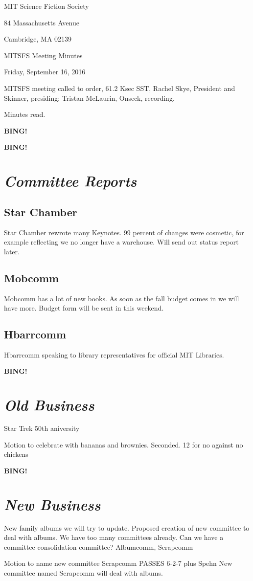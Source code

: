\documentclass[10pt]{article}
\newcommand{\bing}{{\bf BING!} }
\newcommand{\goto}[1]{\bing \vskip 12pt \section*{{\em{#1}}}}
\newcommand{\ps}{ plus Spehn\xspace}
\newcommand{\skinner}{Rachel Skye, President and Skinner}
\newcommand{\onseck}{Tristan McLaurin, Onseck}
\newcommand{\meetingdate}{Friday, September 16, 2016}
\begin{document}
\begin{center}

MIT Science Fiction Society

84 Massachusetts Avenue

Cambridge, MA 02139

\vspace{12pt}

MITSFS Meeting Minutes

\meetingdate

\end{center}

\vspace{18pt}

\setlength{\parskip}{6pt}

\noindent
MITSFS meeting called to order, 61.2 Ksec SST,
\skinner, presiding; \onseck, recording.

Minutes read.

\bing

\goto{Committee Reports}
\subsection*{Star Chamber}
Star Chamber rewrote many Keynotes. 99 percent of changes were cosmetic, for example reflecting we no longer have a warehouse. Will send out status report later.

\subsection*{Mobcomm}
Mobcomm has a lot of new books. As soon as the fall budget comes in we will have more. Budget form will be sent in this weekend.

\subsection*{Hbarrcomm}
Hbarrcomm speaking to library representatives for official MIT Libraries.

\goto{Old Business}
Star Trek 50th aniversity

Motion to celebrate with bananas and brownies. Seconded. 
12 for no against no chickens

\goto{New Business}
New family albums we will try to update. Proposed creation of new committee to deal with albums. We have too many committees already. Can we have a committee consolidation committee? Albumcomm, Scrapcomm

Motion to name new committee  Scrapcomm
PASSES 6-2-7\ps
New committee named Scrapcomm will deal with albums.
\end{document}
